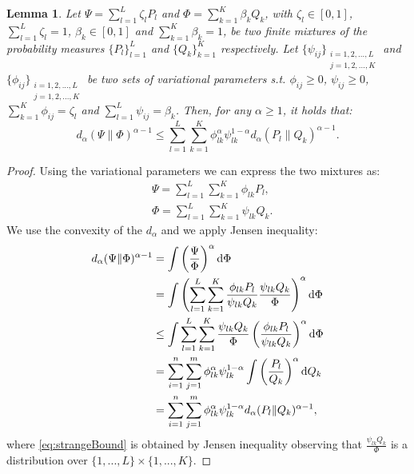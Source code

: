 \documentclass{article}
\newtheorem{lemma}{Lemma}
\begin{document}
\begin{lemma}
	Let $\Psi = \sum_{l=1}^L \zeta_l P_l$ and $\Phi = \sum_{k=1}^K \beta_k Q_k$, with $\zeta_l \in [0,1]$, $\sum_{l=1}^L \zeta_l =1$, $\beta_k \in [0,1]$ and $\sum_{k=1}^K \beta_k =1$, be two finite mixtures of the probability measures $\{P_l\}_{l=1}^L$ and $\{Q_k\}_{k=1}^K$ respectively. Let $\{ \psi_{ij} \}_{\substack{i=1,2,...,L \\ j=1,2,...,K}}$ and $\{ \phi_{ij} \}_{\substack{i=1,2,...,L \\ j=1,2,...,K}}$ be two sets of variational parameters s.t. $\phi_{ij} \ge 0$, $\psi_{ij} \ge 0$, $\sum_{k=1}^K \phi_{ij}=\zeta_l$ and $\sum_{l=1}^L \psi_{ij}=\beta_k$. Then, for any $\alpha \ge 1$, it holds that: 
     \begin{equation*}
        d_{\alpha} (\Psi \| \Phi)^{\alpha-1} \le \sum_{l=1}^L \sum_{k=1}^K \phi_{lk}^\alpha \psi_{lk}^{1-\alpha} d_{\alpha} (P_l \| Q_k)^{\alpha-1}.
    \end{equation*}
\end{lemma}

\begin{proof}
Using the variational parameters we can express the two mixtures as:
\begin{align*}
    & \Psi = \sum_{l=1}^L \sum_{k=1}^K \phi_{lk} P_l,\\
    & \Phi = \sum_{l=1}^L \sum_{k=1}^K \psi_{lk} Q_k.
\end{align*}
    We use the convexity of the $d_{\alpha}$ and we apply Jensen inequality:
    \begin{align}
        d_{\alpha}(\Psi \| \Phi)^{\alpha-1} & = \int \left( \frac{\Psi}{\Phi} \right)^{\alpha} \mathrm{d}\Phi \notag\\
        & = \int \left( \sum_{l=1}^L \sum_{k=1}^K \frac{\phi_{lk} P_l}{\psi_{lk} Q_k} \frac{\psi_{lk} Q_k}{\Phi} \right)^{\alpha} \mathrm{d}\Phi \notag \\
        & \le \int \sum_{l=1}^L \sum_{k=1}^K \frac{\psi_{lk} Q_k}{\Phi} \left(  \frac{\phi_{lk} P_l}{\psi_{lk} Q_k}  \right)^{\alpha} \mathrm{d}\Phi \label{eq:strangeBound}\\
        & = \sum_{i=1}^n \sum_{j=1}^m \phi_{lk}^{\alpha} \psi_{lk}^{1-\alpha}  \int \left( \frac{P_l}{Q_k}  \right)^{\alpha} \mathrm{d}Q_k \notag \\
        & = \sum_{i=1}^n \sum_{j=1}^m \phi_{lk}^{\alpha} \psi_{lk}^{1-\alpha}  d_{\alpha}(P_l \| Q_k)^{\alpha-1}, \notag
    \end{align}
    where \eqref{eq:strangeBound} is obtained by Jensen inequality observing that $\frac{\psi_{lk} Q_k}{\Phi}$ is a distribution over $\{1,...,L\} \times \{1,...,K\}$.
\end{proof}
\end{document}
